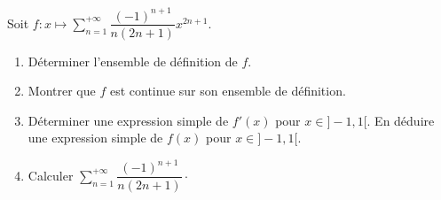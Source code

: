 \documentclass[a4paper,twoside,french,11pt]{VcCours}
\begin{document}
  
  \begin{Exercice}{} Soit $f : x \mapsto \sum_{n=1}^{+ \infty} \dfrac{(-1)^{n+1}}{n(2n+1)} x^{2n+1}$.

\begin{enumerate}
\item Déterminer l'ensemble de définition de $f$.
\item Montrer que $f$ est continue sur son ensemble de définition.
\item Déterminer une expression simple de $f'(x)$ pour $x \in ]-1,1[$. En déduire une expression simple de $f(x)$ pour $x \in ]-1,1[$.
\item Calculer $ \sum_{n=1}^{+ \infty} \dfrac{(-1)^{n+1}}{n(2n+1)} \cdot$
\end{enumerate}
\end{Exercice}
\end{document}

